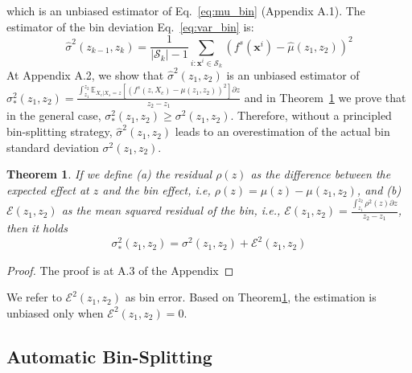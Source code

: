 \documentclass{ecai}  %
\newtheorem{theorem}{Theorem}
\newcommand{\dfdx}{f^s}
\begin{document}
%
which is an unbiased estimator of Eq.~\eqref{eq:mu_bin} (Appendix A.1).
The estimator of the bin deviation Eq.~\eqref{eq:var_bin} is:
%
\begin{equation}
  \label{eq:var_bin_approx}
  \hat{\sigma}^2(z_{k-1}, z_k) = \frac{1}{|\mathcal{S}_k| - 1}
\sum_{i:\mathbf{x}^i \in \mathcal{S}_k} \left ( \dfdx(\mathbf{x}^i) -
  \hat{\mu}(z_1, z_2) \right )^2
\end{equation}
%
At Appendix A.2, we show that \(\hat{\sigma}^2(z_1, z_2)\) is an unbiased estimator
of \(\sigma^2_*(z_1, z_2) = \frac{\int_{z_1}^{z_2} \mathbb{E}_{X_c|X_s=z}
  \left [ (f^s(z, X_c) - \mu(z_1, z_2) )^2 \right] \partial z}{z_2 -
  z_1} \) and in Theorem~\ref{sec:theorem-1} we prove that in the general
case, \(\sigma_*^2(z_1, z_2) \geq \sigma^2(z_1, z_2)\).
Therefore, without a principled bin-splitting strategy,
\(\hat{\sigma}^2(z_1, z_2)\) leads to an overestimation of the actual bin standard
deviation \(\sigma^2(z_1, z_2)\).
%
\begin{theorem}
  \label{sec:theorem-1}
  If we define (a) the residual \(\rho(z)\) as the difference between
  the expected effect at \(z\) and the bin effect, i.e,
  \(\rho(z) = \mu(z) - \mu(z_1, z_2)\), and (b)
  \(\mathcal{E}(z_1, z_2)\) as the mean squared residual of the bin,
  i.e.,
  \(\mathcal{E}(z_1, z_2) = \frac{\int_{z_1}^{z_2}\rho^2(z) \partial
    z}{z_2 - z_1}\), then it holds
%
\begin{equation}
    \label{eq:bin-uncertainty-proof}
 \sigma_*^2(z_1, z_2) = \sigma^2(z_1, z_2) + \mathcal{E}^2(z_1, z_2)
\end{equation}
\end{theorem}
%
\begin{proof}
The proof is at A.3 of the Appendix %
\end{proof}
%
We refer to \(\mathcal{E}^2(z_1, z_2)\) as bin error.
Based on
Theorem\ref{sec:theorem-1}, the estimation is unbiased only when
\(\mathcal{E}^2(z_1, z_2) = 0\).

\subsection{Automatic Bin-Splitting}
\label{subsec:bin-spliting}
\end{document}
